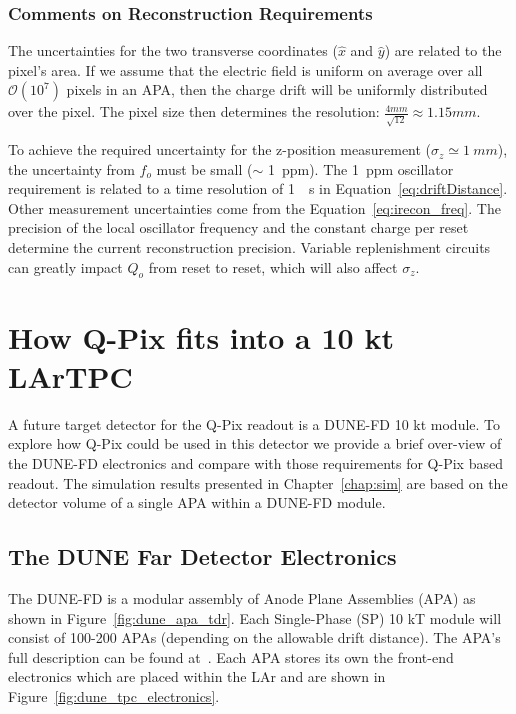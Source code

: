 \subsubsection{Comments on Reconstruction Requirements}
\label{sec:recon_uncert}
The uncertainties for the two transverse coordinates ($\hat{x}$ and $\hat{y}$) are related to the pixel's area.
If we assume that the electric field is uniform on average over all $\mathcal{O}(10^{7})$ pixels in an APA, then the charge drift will be uniformly distributed over the pixel.
The pixel size then determines the resolution: $\frac{4 mm}{\sqrt{12}} \approx 1.15 mm$.

To achieve the required uncertainty for the z-position measurement ($\sigma_{z} \simeq 1~\unit{mm}$), the uncertainty from $f_{o}$ must be small ($\sim$ 1~\unit{ppm}).
The 1~\unit{ppm} oscillator requirement is related to a time resolution of 1~\unit{\mu s} in Equation~\ref{eq:driftDistance}.
Other measurement uncertainties come from the Equation~\ref{eq:irecon_freq}.
The precision of the local oscillator frequency and the constant charge per reset determine the current reconstruction precision.
Variable replenishment circuits can greatly impact $Q_{o}$ from reset to reset, which will also affect $\sigma_{z}$.

\section{How Q-Pix fits into a 10 kt LArTPC}
\label{sec:qpix_apa}
A future target detector for the Q-Pix readout is a DUNE-FD 10 kt module.
To explore how Q-Pix could be used in this detector we provide a brief over-view of the DUNE-FD electronics and compare with those requirements for Q-Pix based readout.
The simulation results presented in Chapter~\ref{chap:sim} are based on the detector volume of a single APA within a DUNE-FD module.

\subsection{The DUNE Far Detector Electronics}
The DUNE-FD is a modular assembly of Anode Plane Assemblies (APA) as shown in Figure~\ref{fig:dune_apa_tdr}.
Each Single-Phase (SP) 10 kT module will consist of 100-200 APAs (depending on the allowable drift distance).
The APA's full description can be found at~\citep{DUNE-FD_TDRv4:Abi_2020}.
Each APA stores its own the front-end electronics which are placed within the LAr and are shown in Figure~\ref{fig:dune_tpc_electronics}.


